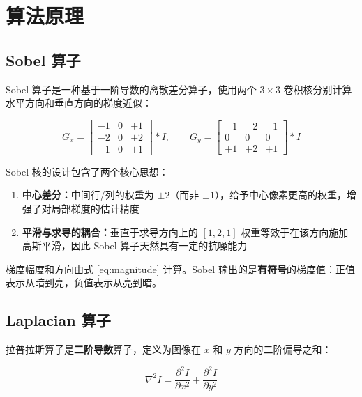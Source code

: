 \documentclass[12pt,a4paper]{ctexart}
\begin{document}
\newpage

\section{算法原理}

\subsection{Sobel 算子}

Sobel 算子是一种基于一阶导数的离散差分算子，使用两个 $3\times3$ 卷积核分别计算水平方向和垂直方向的梯度近似：

\begin{equation}
    G_x = \begin{bmatrix}
        -1 & 0 & +1 \\
        -2 & 0 & +2 \\
        -1 & 0 & +1
    \end{bmatrix} * I,
    \qquad
    G_y = \begin{bmatrix}
        -1 & -2 & -1 \\
         0 &  0 &  0 \\
        +1 & +2 & +1
    \end{bmatrix} * I
    \label{eq:sobel_kernels}
\end{equation}

Sobel 核的设计包含了两个核心思想：
\begin{enumerate}[leftmargin=*]
    \item \textbf{中心差分：}中间行/列的权重为 $\pm2$（而非 $\pm1$），给予中心像素更高的权重，增强了对局部梯度的估计精度
    \item \textbf{平滑与求导的耦合：}垂直于求导方向上的 $[1,2,1]$ 权重等效于在该方向施加高斯平滑，因此 Sobel 算子天然具有一定的抗噪能力
\end{enumerate}

梯度幅度和方向由式 \ref{eq:magnitude} 计算。Sobel 输出的是\textbf{有符号}的梯度值：正值表示从暗到亮，负值表示从亮到暗。

\subsection{Laplacian 算子}

拉普拉斯算子是\textbf{二阶导数}算子，定义为图像在 $x$ 和 $y$ 方向的二阶偏导之和：

\begin{equation}
    \nabla^2 I = \frac{\partial^2 I}{\partial x^2} + \frac{\partial^2 I}{\partial y^2}
    \label{eq:laplacian}
\end{equation}
\end{document}
